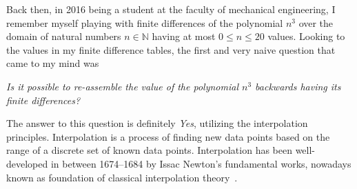 Back then, in 2016 being a student at the faculty of mechanical engineering,
I remember myself playing with finite differences of the polynomial $n^3$ over the domain of natural numbers $n\in\mathbb{N}$
having at most $0 \leq n \leq 20$ values.
Looking to the values in my finite difference tables, the first and very naive question that came to my mind was
\begin{center}
    \textit{Is it possible to re-assemble the value of
    the polynomial $n^3$ backwards having its finite differences?}
\end{center}
The answer to this question is definitely \textit{Yes}, utilizing the interpolation principles.
Interpolation is a process of finding new data points based on the range of a discrete set of known data points.
Interpolation has been well-developed in between 1674--1684
by Issac Newton's fundamental works, nowadays known as foundation of classical interpolation
theory~\cite{meijering2002chronology}.

